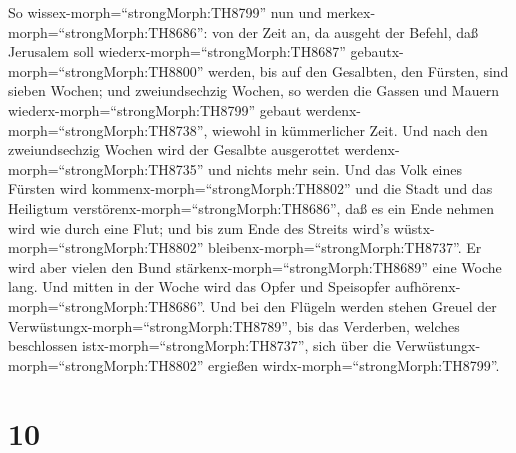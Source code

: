 So wissex-morph=``strongMorph:TH8799'' nun und
merkex-morph=``strongMorph:TH8686'': von der Zeit an, da ausgeht der
Befehl, daß Jerusalem soll wiederx-morph=``strongMorph:TH8687''
gebautx-morph=``strongMorph:TH8800'' werden, bis auf den Gesalbten, den
Fürsten, sind sieben Wochen; und zweiundsechzig Wochen, so werden die
Gassen und Mauern wiederx-morph=``strongMorph:TH8799'' gebaut
werdenx-morph=``strongMorph:TH8738'', wiewohl in kümmerlicher Zeit.
 Und nach den zweiundsechzig Wochen wird der Gesalbte
ausgerottet werdenx-morph=``strongMorph:TH8735'' und nichts mehr sein.
Und das Volk eines Fürsten wird kommenx-morph=``strongMorph:TH8802'' und
die Stadt und das Heiligtum verstörenx-morph=``strongMorph:TH8686'', daß
es ein Ende nehmen wird wie durch eine Flut; und bis zum Ende des
Streits wird's wüstx-morph=``strongMorph:TH8802''
bleibenx-morph=``strongMorph:TH8737''.  Er wird aber vielen
den Bund stärkenx-morph=``strongMorph:TH8689'' eine Woche lang. Und
mitten in der Woche wird das Opfer und Speisopfer
aufhörenx-morph=``strongMorph:TH8686''. Und bei den Flügeln werden
stehen Greuel der Verwüstungx-morph=``strongMorph:TH8789'', bis das
Verderben, welches beschlossen istx-morph=``strongMorph:TH8737'', sich
über die Verwüstungx-morph=``strongMorph:TH8802'' ergießen
wirdx-morph=``strongMorph:TH8799''.

\hypertarget{section-9}{%
\section{10}\label{section-9}}

